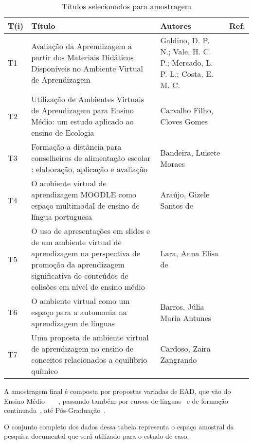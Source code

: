 \begin{table}[ht!]
  \footnotesize
  \centering
  \caption{Títulos selecionados para amostragem}
  \label{tab:trab}
  \begin{tabular}{|l|>{\raggedright\arraybackslash}p{9cm}|>{\raggedright\arraybackslash}p{4cm}|c|} 
    \toprule 
     T(i) & Título & Autores & Ref.  \\ 
    \midrule 
        T1 & Avaliação da Aprendizagem a partir dos Materiais Didáticos Disponíveis no Ambiente Virtual de Aprendizagem & Galdino, D. P. N.; Vale, H. C. P.; Mercado, L. P. L.; Costa, E. M. C.  &  ~\cite{t1@ead} \\ \hline 
        T2 & Utilização de Ambientes Virtuais de Aprendizagem para Ensino Médio: um estudo aplicado ao ensino de Ecologia & Carvalho Filho, Cloves Gomes & ~\cite{t2@ead}\\ \hline
        T3 & Formação a distância para conselheiros de alimentação escolar : elaboração, aplicação e avaliação & Bandeira, Luisete Moraes & ~\cite{t3@ead} \\ \hline
        T4 & O ambiente virtual de aprendizagem MOODLE como espaço multimodal de ensino de língua portuguesa & Araújo, Gizele Santos de & ~\cite{t4@ead} \\ \hline
        T5 & O uso de apresentações em slides e de um ambiente virtual de aprendizagem na perspectiva de promoção da aprendizagem significativa de conteúdos de colisões em nível de ensino médio & Lara, Anna Elisa de  & ~\cite{t5@ead} \\ \hline
        T6 & O ambiente virtual como um espaço para a autonomia na aprendizagem de línguas  & Barros, Júlia Maria Antunes & ~\cite{t6@ead} \\ \hline
        T7 & Uma proposta de ambiente virtual de aprendizagem no ensino de conceitos relacionados a equilíbrio químico  & Cardoso, Zaira Zangrando & ~\cite{t7@ead} \\
    \bottomrule 
\end{tabular}
\end{table}
\vspace{2mm}

 A amostragem final é composta por propostas variadas de EAD, que vão do Ensino Médio~\cite{t2@ead}~\cite{t4@ead}~\cite{t5@ead}~\cite{t6@ead}, passando também por cursos de línguas~\cite{t6@ead} e de formação continuada~\cite{t3@ead}, até Pós-Graduação~\cite{t1@ead}.
 
 O conjunto completo dos dados dessa tabela representa o espaço amostral da pesquisa documental que será utilizado para o estudo de caso.

